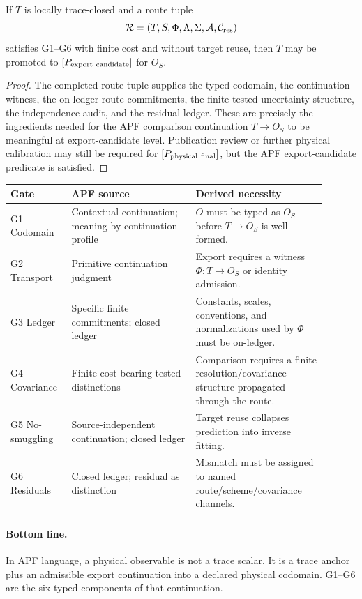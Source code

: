 \begin{corollary}
If $T$ is locally trace-closed and a route tuple
\[
        \mathcal R=(T,S,\Phi,\Lambda,\Sigma,\mathcal A,\mathcal C_{\rm res})
\]
satisfies G1--G6 with finite cost and without target reuse, then $T$ may be promoted to $[P_{\rm export\ candidate}]$ for $O_S$.
\end{corollary}

\begin{proof}
The completed route tuple supplies the typed codomain, the continuation witness, the on-ledger route commitments, the finite tested uncertainty structure, the independence audit, and the residual ledger.  These are precisely the ingredients needed for the APF comparison continuation $T\to O_S$ to be meaningful at export-candidate level.  Publication review or further physical calibration may still be required for $[P_{\rm physical\ final}]$, but the APF export-candidate predicate is satisfied.  \qedhere
\end{proof}

\begin{center}
\renewcommand{\arraystretch}{1.25}
\begin{tabular}{p{0.16\linewidth}p{0.36\linewidth}p{0.38\linewidth}}
\hline
\textbf{Gate} & \textbf{APF source} & \textbf{Derived necessity}\\
\hline
G1 Codomain & Contextual continuation; meaning by continuation profile & $O$ must be typed as $O_S$ before $T\to O_S$ is well formed.\\
G2 Transport & Primitive continuation judgment & Export requires a witness $\Phi:T\mapsto O_S$ or identity admission.\\
G3 Ledger & Specific finite commitments; closed ledger & Constants, scales, conventions, and normalizations used by $\Phi$ must be on-ledger.\\
G4 Covariance & Finite cost-bearing tested distinctions & Comparison requires a finite resolution/covariance structure propagated through the route.\\
G5 No-smuggling & Source-independent continuation; closed ledger & Target reuse collapses prediction into inverse fitting.\\
G6 Residuals & Closed ledger; residual as distinction & Mismatch must be assigned to named route/scheme/covariance channels.\\
\hline
\end{tabular}
\end{center}

\paragraph{Bottom line.}
In APF language, a physical observable is not a trace scalar.  It is a trace anchor plus an admissible export continuation into a declared physical codomain.  G1--G6 are the six typed components of that continuation.
